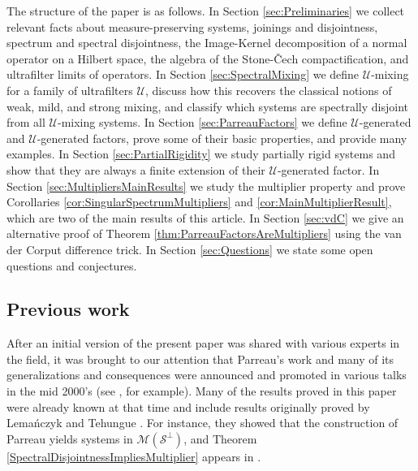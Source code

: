 \documentclass[graybox]{svmult}
\theoremstyle{definition}
\begin{document}
The structure of the paper is as follows.
In Section \ref{sec:Preliminaries} we collect relevant facts about measure-preserving systems, joinings and disjointness, spectrum and spectral disjointness, the Image-Kernel decomposition of a normal operator on a Hilbert space, the algebra of the Stone-\v{C}ech compactification, and ultrafilter limits of operators.
In Section \ref{sec:SpectralMixing} we define $\mathcal{U}$-mixing for a family of ultrafilters $\mathcal{U}$, discuss how this recovers the classical notions of weak, mild, and strong mixing, and classify which systems are spectrally disjoint from all $\mathcal{U}$-mixing systems.
In Section \ref{sec:ParreauFactors} we define $\mathcal U$-generated and $\mathcal U$-generated factors, prove some of their basic properties, and provide many examples.
In Section \ref{sec:PartialRigidity} we study partially rigid systems and show that they are always a finite extension of their $\mathcal U$-generated factor.
In Section \ref{sec:MultipliersMainResults} we study the multiplier property and prove Corollaries \ref{cor:SingularSpectrumMultipliers} and \ref{cor:MainMultiplierResult}, which are two of the main results of this article.
In Section \ref{sec:vdC} we give an alternative proof of Theorem \ref{thm:ParreauFactorsAreMultipliers} using the van der Corput difference trick.
In Section \ref{sec:Questions} we state some open questions and conjectures.\\


\subsection{Previous work}

After an initial version of the present paper was shared with various experts in the field, it was brought to our attention that Parreau's work \cite{ParreauFactor} and many of its generalizations and consequences were announced and promoted in various talks in the mid 2000's (see \cite{Lemanczyk_Parreau}, for example). 
Many of the results proved in this paper were already known at that time and include results originally proved by Lema\'nczyk \cite{Lemanczyk_IET,Lemanczyk_Parreau} and Tehungue \cite{Tehungue2024Parreau}. 
For instance, they showed that the construction of Parreau yields systems in $\mathscr{M}(\mathcal{S}^\perp)$, and Theorem \ref{SpectralDisjointnessImpliesMultiplier} appears in \cite{Lemanczyk_IET,Lemanczyk_Parreau}.
\end{document}
